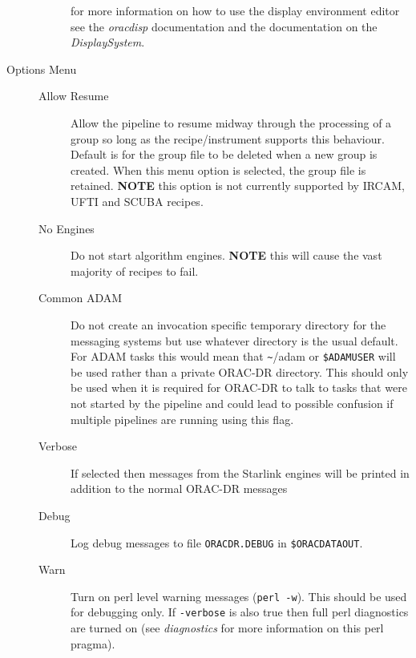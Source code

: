 \documentclass[twoside,11pt]{article}
\renewcommand{\_}{\texttt{\symbol{95}}}
\begin{document}
\begin{description}
\begin{description}
for more information on how to use the display environment editor see
the \emph{oracdisp} documentation and the documentation on the
\emph{DisplaySystem}.

\end{description}

\item[{Options Menu}] \mbox{}\begin{description}

\item[{Allow Resume}] \mbox{}

Allow the pipeline to resume midway through the processing of a group
so long as the recipe/instrument supports this behaviour. Default is
for the group file to be deleted when a new group is created. When
this menu option is selected, the group file is retained. \textbf{NOTE} this
option is not currently supported by IRCAM, UFTI and SCUBA recipes.


\item[{No Engines}] \mbox{}

Do not start algorithm engines. \textbf{NOTE} this will cause the vast
majority of recipes to fail.


\item[{Common ADAM}] \mbox{}

Do not create an invocation specific temporary directory for the
messaging systems but use whatever directory is the usual default. For
ADAM tasks this would mean that \texttt{\~{}}/adam or \texttt{\$ADAM\_USER} will be used
rather than a private ORAC-DR directory. This should only be used when
it is required for ORAC-DR to talk to tasks that were not started by
the pipeline and could lead to possible confusion if multiple
pipelines are running using this flag.


\item[{Verbose}] \mbox{}

If selected then messages from the Starlink engines will be printed in
addition to the normal ORAC-DR messages


\item[{Debug}] \mbox{}

Log debug messages to file \texttt{ORACDR.DEBUG} in \texttt{\$ORAC\_DATA\_OUT}.


\item[{Warn}] \mbox{}

Turn on perl level warning messages (\texttt{perl -w}). This should be used
for debugging only. If \texttt{-verbose} is also true then full perl
diagnostics are turned on (see \emph{diagnostics} for more information on
this perl pragma).



\end{description}
\end{description}
\end{document}
